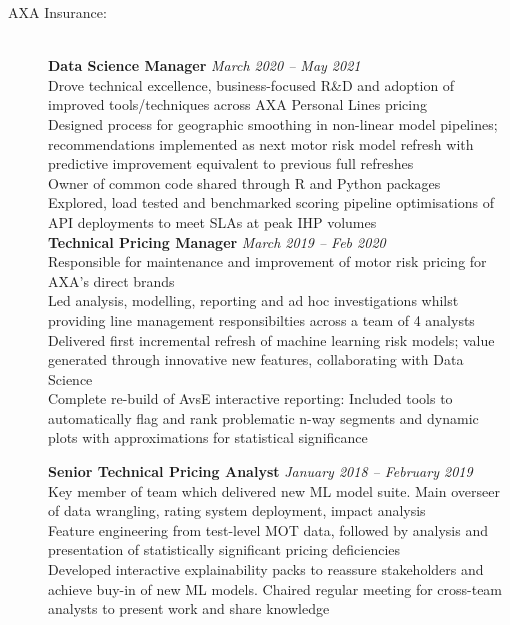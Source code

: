 \documentclass[11pt]{article}
\begin{document}
\begin{description}
\item[AXA Insurance:] \hspace{1mm} \\
\textbf{Data Science Manager} \emph{March 2020 -- May 2021}\\
\textbullet \quad Drove technical excellence, business-focused R\&D and adoption of improved tools/techniques across AXA Personal Lines pricing \\
\textbullet \quad Designed process for geographic smoothing in non-linear model pipelines; recommendations implemented as next motor risk model refresh with predictive improvement equivalent to previous full refreshes\\
\textbullet \quad Owner of common code shared through R and Python packages\\
\textbullet \quad Explored, load tested and benchmarked scoring pipeline optimisations of API deployments to meet SLAs at peak IHP volumes\\

\textbf{Technical Pricing Manager} \emph{March 2019 -- Feb 2020}\\
\textbullet \quad Responsible for maintenance and improvement of motor risk pricing for AXA's direct brands\\
\textbullet \quad Led analysis, modelling, reporting and ad hoc investigations whilst providing line management responsibilties across a team of 4 analysts\\
\textbullet \quad Delivered first incremental refresh of machine learning risk models; value generated through innovative new features, collaborating with Data Science\\
\textbullet \quad Complete re-build of AvsE interactive reporting: Included tools to automatically flag and rank problematic n-way segments and dynamic plots with approximations for statistical significance

\textbf{Senior Technical Pricing Analyst} \emph{January 2018 -- February 2019}\\
\textbullet \quad Key member of team which delivered new ML model suite. Main overseer of data wrangling, rating system deployment, impact analysis\\
\textbullet \quad Feature engineering from test-level MOT data, followed by analysis and presentation of statistically significant pricing deficiencies \\
\textbullet \quad Developed interactive explainability packs to reassure stakeholders and achieve buy-in of new ML models.
\textbullet \quad Chaired regular meeting for cross-team analysts to present work and share knowledge 


\end{description}
\end{document}

